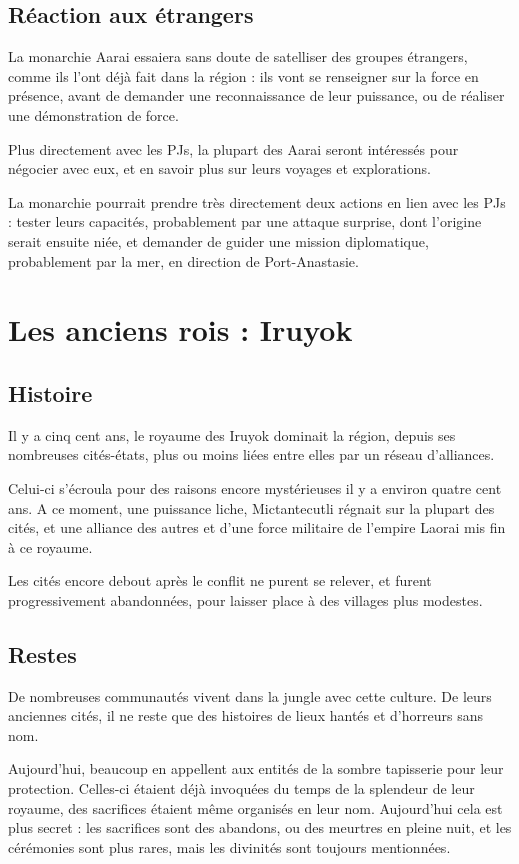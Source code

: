 \documentclass[10pt,a4paper]{book}
\begin{document}
\subsection{Réaction aux étrangers}
La monarchie Aarai essaiera sans doute de satelliser des groupes étrangers, comme ils l'ont déjà fait dans la région : ils vont se renseigner sur la force en présence, avant de demander une reconnaissance de leur puissance, ou de réaliser une démonstration de force.

Plus directement avec les PJs, la plupart des Aarai seront intéressés pour négocier avec eux, et en savoir plus sur leurs voyages et explorations.

La monarchie pourrait prendre très directement deux actions en lien avec les PJs : tester leurs capacités, probablement par une attaque surprise, dont l'origine serait ensuite niée, et demander de guider une mission diplomatique, probablement par la mer, en direction de Port-Anastasie.

\section{Les anciens rois : Iruyok}
\subsection{Histoire}
Il y a cinq cent ans, le royaume des Iruyok dominait la région, depuis ses nombreuses cités-états, plus ou moins liées entre elles par un réseau d'alliances.

Celui-ci s'écroula pour des raisons encore mystérieuses il y a environ quatre cent ans. A ce moment, une puissance liche, Mictantecutli régnait sur la plupart des cités, et une alliance des autres et d'une force militaire de l'empire Laorai mis fin à ce royaume.

Les cités encore debout après le conflit ne purent se relever, et furent progressivement abandonnées, pour laisser place à des villages plus modestes.
\subsection{Restes}
De nombreuses communautés vivent dans la jungle avec cette culture. De leurs anciennes cités, il ne reste que des histoires de lieux hantés et d'horreurs sans nom. 

Aujourd'hui, beaucoup en appellent aux entités de la sombre tapisserie pour leur protection. Celles-ci étaient déjà invoquées du temps de la splendeur de leur royaume, des sacrifices étaient même organisés en leur nom. Aujourd'hui cela est plus secret : les sacrifices sont des abandons, ou des meurtres en pleine nuit, et les cérémonies sont plus rares, mais les divinités sont toujours mentionnées.
\end{document}
